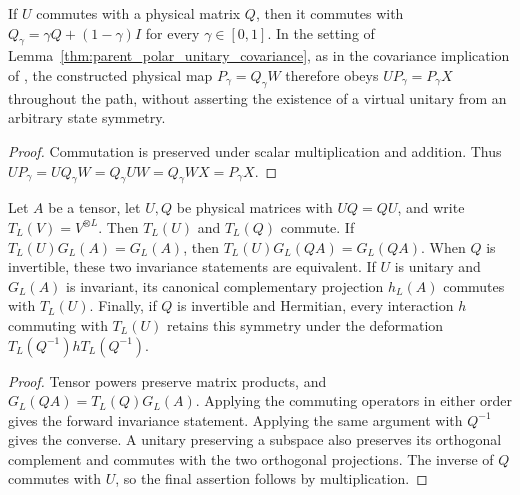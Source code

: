 \begin{lemma}
    \label{thm:isometric_deformation_unitary_covariance}
    \leanok
    If $U$ commutes with a physical matrix $Q$, then it commutes with
    $Q_\gamma=\gamma Q+(1-\gamma)I$ for every $\gamma\in[0,1]$.
    In the setting of Lemma~\ref{thm:parent_polar_unitary_covariance}, as in
    the covariance implication of \cite[lines~672--676]{Schuch2011Phases},
    the constructed physical map $P_\gamma=Q_\gamma W$ therefore obeys
    $UP_\gamma=P_\gamma X$ throughout the path, without asserting the
    existence of a virtual unitary from an arbitrary state symmetry.
\end{lemma}

\begin{proof}
    \leanok
    Commutation is preserved under scalar multiplication and addition.
    Thus $UP_\gamma=UQ_\gamma W=Q_\gamma UW=Q_\gamma WX=P_\gamma X$.
\end{proof}

\begin{lemma}
    \label{thm:parent_invariant_space_physical_deformation}
    \leanok
    Let $A$ be a tensor, let $U,Q$ be physical matrices with $UQ=QU$,
    and write $T_L(V)=V^{\otimes L}$. Then $T_L(U)$ and $T_L(Q)$
    commute. If $T_L(U)G_L(A)=G_L(A)$, then
    $T_L(U)G_L(QA)=G_L(QA)$. When $Q$ is invertible, these two
    invariance statements are equivalent. If $U$ is unitary and
    $G_L(A)$ is invariant, its canonical complementary projection $h_L(A)$
    commutes with $T_L(U)$. Finally, if $Q$ is invertible and Hermitian,
    every interaction $h$ commuting with $T_L(U)$ retains this symmetry
    under the deformation $T_L(Q^{-1})hT_L(Q^{-1})$.
\end{lemma}

\begin{proof}
    \leanok
    Tensor powers preserve matrix products, and
    $G_L(QA)=T_L(Q)G_L(A)$. Applying the commuting operators in either
    order gives the forward invariance statement. Applying the same
    argument with $Q^{-1}$ gives the converse. A unitary preserving a
    subspace also preserves its orthogonal complement and commutes with
    the two orthogonal projections. The inverse of $Q$ commutes with $U$,
    so the final assertion follows by multiplication.
\end{proof}

